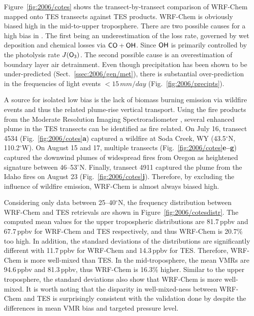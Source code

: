 	
Figure~\ref{fig:2006/cotes} shows the transect-by-transect comparison of WRF-Chem  mapped onto TES transects against TES 
products. WRF-Chem is obviously biased high in the mid-to-upper troposphere. There are two possible causes for a high bias in . The first being an
underestimation of the loss rate, governed by wet deposition and chemical losses via $\chem{CO}+\chem{OH}$. Since $\chem{OH}$ is primarily controlled by
the photolysis rate $J(\chem{O_3})$. The second possible cause is an overestimation of boundary layer air detrainment. Even though precipitation has been shown to be
under-predicted (Sect.~\ref{ssec:2006/gen/met}), there is substantial over-prediction in the frequencies of light events $<15\,\unit{mm/day}$ (Fig.~\ref{fig:2006/precipts}).

A source for isolated low bias is the lack of biomass burning emission via wildfire events and thus the related plume-rise vertical transport. Using the fire products from
the Moderate Resolution Imaging Spectroradiometer \citep[MODIS;][]{Justice:2002zr}, several enhanced  plume in the TES transects can be identified as fire
related. On July 16, transect 4534 (Fig.~\ref{fig:2006/cotes}{\bf a}) captured a wildfire at Soda Creek, WY (43.5$^\circ$N, 110.2$^\circ$W). On August 15 and 17, multiple
transects (Fig.~\ref{fig:2006/cotes}{\bf e--g}) captured the downwind plumes of widespread fires from Oregon as heightened  signature between 46--53$^\circ$N.
Finally, transect 4911 captured the plume from the Idaho fires on August 23 (Fig.~\ref{fig:2006/cotes}{\bf j}). Therefore, by excluding the influence of wildfire emission,
WRF-Chem is almost always biased high.

Considering only data between 25--40$^\circ$N, the frequency distribution between WRF-Chem and TES retrievals are shown in Figure~\ref{fig:2006/cotesdistr}. The
computed mean values for the upper tropospheric distributions are 81.7\,\unit{ppbv} and 67.7\,\unit{ppbv} for WRF-Chem and TES respectively, and thus WRF-Chem is
20.7\% too high. In addition, the standard deviations of the distributions are significantly different with 11.7\,\unit{ppbv} for WRF-Chem and 14.3\,\unit{ppbv} for TES. Therefore,
WRF-Chem is more well-mixed than TES. In the mid-troposphere, the mean VMRs are 94.6\,\unit{ppbv} and 81.3\,\unit{ppbv}, thus WRF-Chem is 16.3\% higher. Similar
to the upper troposphere, the standard deviations also show that WRF-Chem is more well-mixed. It is worth noting that the disparity in  well-mixed-ness between
WRF-Chem and TES is surprisingly consistent with the validation done by \citep{Barth:2012qf} despite the differences in mean VMR bias and targeted pressure level.

